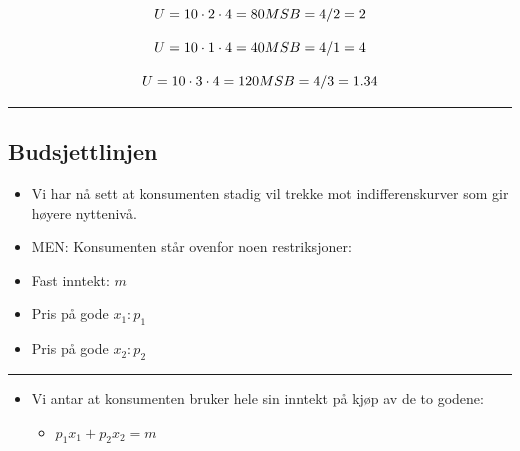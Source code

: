 \documentclass[
  letterpaper,
  DIV=11,
  numbers=noendperiod]{scrartcl}
\providecommand{\tightlist}{%
  \setlength{\itemsep}{0pt}\setlength{\parskip}{0pt}}\usepackage{longtable,booktabs,array}
\begin{document}
\begin{equation*}
U=10\cdot 2 \cdot 4 = 80 \\
MSB =4/2=2
\end{equation*}

\begin{equation*}
U=10\cdot 1 \cdot 4 = 40 \\
MSB =4/1=4
\end{equation*}

\begin{equation*}
U=10\cdot 3 \cdot 4 = 120 \\
MSB =4/3=1.34
\end{equation*}

\begin{center}\rule{0.5\linewidth}{0.5pt}\end{center}

\subsection{Budsjettlinjen}\label{budsjettlinjen}

\begin{itemize}
\tightlist
\item
  Vi har nå sett at konsumenten stadig vil trekke mot indifferenskurver
  som gir høyere nyttenivå.
\item
  MEN: Konsumenten står ovenfor noen restriksjoner:
\item
  Fast inntekt: \(m\)
\item
  Pris på gode \(x_1: p_1\)
\item
  Pris på gode \(x_2 : p_2\)
\end{itemize}

\begin{center}\rule{0.5\linewidth}{0.5pt}\end{center}

\begin{itemize}
\tightlist
\item
  Vi antar at konsumenten bruker hele sin inntekt på kjøp av de to
  godene:

  \begin{itemize}
  \tightlist
  \item
    \(p_1x_1 + p_2x_2 = m\)
  \end{itemize}
\end{itemize}
\end{document}
